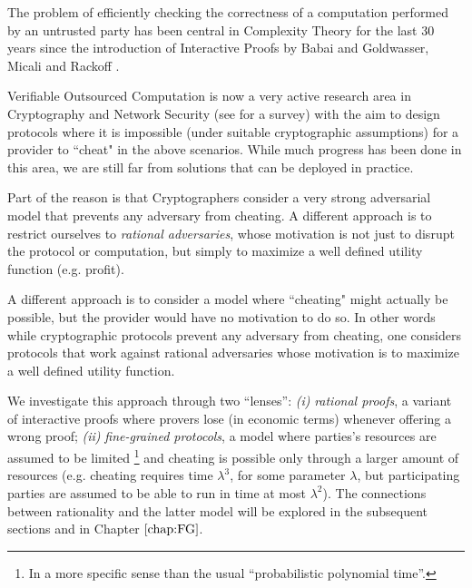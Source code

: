 

The problem of efficiently checking the correctness of a computation performed by an untrusted party has been central in Complexity Theory for the last 30 years since the introduction of Interactive Proofs by Babai and Goldwasser, Micali and Rackoff \cite{babai,gmr}. 

{\sf Verifiable Outsourced Computation} is now a very active research area in Cryptography and Network Security (see \cite{wb15} for a survey) with the aim to design protocols where it is impossible (under suitable cryptographic assumptions) for a provider to ``cheat" in the above scenarios. While much progress has been done in this area, we are still far from solutions that can be deployed in practice. 

Part of the reason is that Cryptographers consider a very strong adversarial model that prevents {\sf any} adversary from cheating. A different approach is to restrict ourselves to {\em rational adversaries}, whose motivation is not just to disrupt the protocol or computation, but simply to maximize a well defined utility function (e.g. profit).

A different approach is to consider a model where ``cheating" might actually be possible, but the provider would have no motivation to do so. In other words while cryptographic protocols prevent {\sf any} adversary from cheating, one considers protocols that work against {\sf rational} adversaries whose motivation is to maximize a well defined utility function. 

We investigate this approach through two ``lenses'': \textit{(i)} \textit{rational proofs}, a variant of interactive proofs where provers lose (in economic terms) whenever offering a wrong proof; \textit{(ii)} \textit{fine-grained protocols}, a model where parties's resources are assumed to be limited \footnote{In a more specific sense than the usual ``probabilistic polynomial time''.} and cheating is possible only through a larger amount of resources (e.g. cheating requires time $\lambda^3$, for some parameter $\lambda$, but participating parties are assumed to be able to run in time at most $\lambda^2$). The connections between rationality and the latter model will be explored in the subsequent sections and in Chapter $\ref{chap:FG}$.

